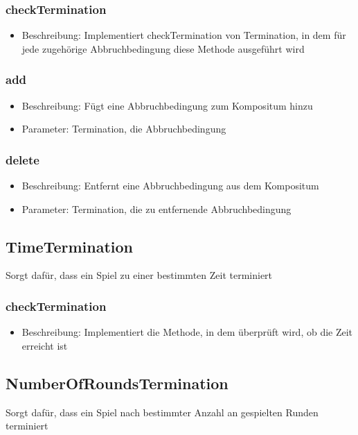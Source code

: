 \documentclass[a4paper]{scrreprt}
\begin{document}
   \subsubsection{checkTermination}
      \begin{itemize}
         \item Beschreibung: Implementiert checkTermination von Termination, in dem für jede zugehörige Abbruchbedingung diese Methode ausgeführt wird
      \end{itemize}
  \subsubsection{add}
     \begin{itemize}
        \item Beschreibung: Fügt eine Abbruchbedingung zum Kompositum hinzu
        \item Parameter: Termination, die Abbruchbedingung
     \end{itemize}
  \subsubsection{delete}
     \begin{itemize}
        \item Beschreibung: Entfernt eine Abbruchbedingung aus dem Kompositum
        \item Parameter: Termination, die zu entfernende Abbruchbedingung
     \end{itemize}
     
   
   \subsection{TimeTermination}
   Sorgt dafür, dass ein Spiel zu einer bestimmten Zeit terminiert
   \subsubsection{checkTermination}
   \begin{itemize}
      \item Beschreibung: Implementiert die Methode, in dem überprüft wird, ob die Zeit erreicht ist
   \end{itemize}
   
   \subsection{NumberOfRoundsTermination}
   Sorgt dafür, dass ein Spiel nach bestimmter Anzahl an gespielten Runden terminiert
\end{document}
